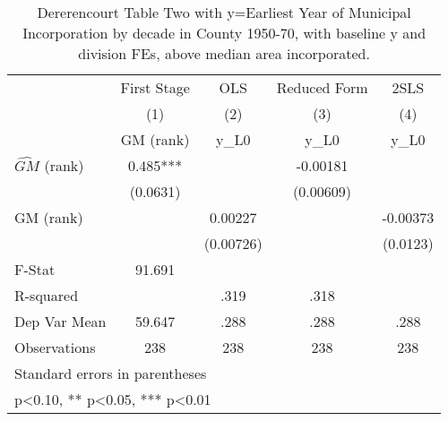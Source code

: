 \begin{table}[htbp]\centering
\def\sym#1{\ifmmode^{#1}\else\(^{#1}\)\fi}
\caption{Dererencourt Table Two with y=Earliest Year of Municipal Incorporation by decade in County 1950-70, with baseline y and division FEs, above median area incorporated.}
\begin{tabular}{l*{4}{c}}
\toprule
                    & First Stage   &         OLS   &Reduced Form   &        2SLS   \\
                    &\multicolumn{1}{c}{(1)}&\multicolumn{1}{c}{(2)}&\multicolumn{1}{c}{(3)}&\multicolumn{1}{c}{(4)}\\
                    &\multicolumn{1}{c}{GM  (rank)}&\multicolumn{1}{c}{y\_L0}&\multicolumn{1}{c}{y\_L0}&\multicolumn{1}{c}{y\_L0}\\
\midrule
$\hat{GM}$ (rank)   &       0.485***&               &    -0.00181   &               \\
                    &    (0.0631)   &               &   (0.00609)   &               \\
\addlinespace
GM  (rank)          &               &     0.00227   &               &    -0.00373   \\
                    &               &   (0.00726)   &               &    (0.0123)   \\
\midrule
F-Stat              &      91.691   &               &               &               \\
R-squared           &               &        .319   &        .318   &               \\
Dep Var Mean        &      59.647   &        .288   &        .288   &        .288   \\
Observations        &         238   &         238   &         238   &         238   \\
\bottomrule
\multicolumn{5}{l}{\footnotesize Standard errors in parentheses}\\
\multicolumn{5}{l}{\footnotesize * p<0.10, ** p<0.05, *** p<0.01}\\
\end{tabular}
\end{table}
